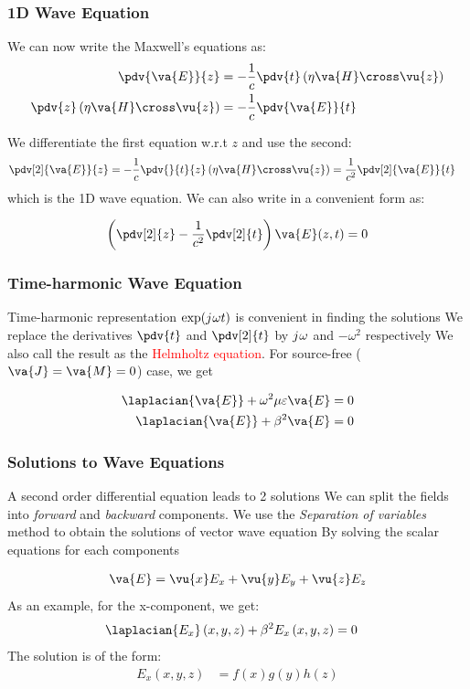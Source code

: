 \documentclass[10pt, compress]{beamer}
\renewcommand{\O}{\omega}  %
\newcommand{\E}{\varepsilon}  %
\renewcommand{\u}{\mu}  %
\renewcommand{\j}{{j}\mkern1mu} %
\begin{document}
\begin{frame}
  \frametitle{1D Wave Equation}
  We can now write the Maxwell's equations as:
  \begin{align*}
     \pdv{\va{E}}{z} &= - \frac{1}{c} \pdv{t} \left( \eta \va{H} \cross \vu{z} \right) \\
     \pdv{z} \left( \eta \va{H} \cross \vu{z} \right) &= -\frac{1}{c} \pdv{\va{E}}{t}
      \end{align*}

    We differentiate the first equation w.r.t $z$ and use the second:
    \begin{align*}
      \pdv[2]{\va{E}}{z} &= - \frac{1}{c} \pdv{}{t}{z} \left( \eta \va{H} \cross \vu{z} \right) = \frac{1}{c^2} \pdv[2]{\va{E}}{t}
    \end{align*}
    which is the 1D wave equation. We can also write in a convenient form as:
    \begin{tcolorbox}
      \begin{align*}
      \left( \pdv[2]{z} - \frac{1}{c^2} \pdv[2]{t}\right) \va{E} (z,t) = 0
    \end{align*}
    \end{tcolorbox}
\end{frame}

\begin{frame}
  \frametitle{Time-harmonic Wave Equation}
  \begin{outline}
    \1 Time-harmonic representation $\exp (\j \O t)$ is convenient in finding the solutions
    \1 We replace the derivatives $\pdv{t}$ and $\pdv[2]{t}$ by $\j \O$ and $-\O^2$ respectively
    \1 We also call the result as the \textcolor{red}{Helmholtz equation}.
    \1 For source-free ($\va{J} = \va{M} = 0$) case, we get
  \end{outline}
  \begin{align*}
    \laplacian{\va{E}} + \O^2 \u \E \va{E} &= 0 \\
    \laplacian{\va{E}} + \beta^2 \va{E} &= 0
  \end{align*}
  \end{frame}

  \begin{frame}
  \frametitle{Solutions to Wave Equations}
  \begin{outline}
    \1 A second order differential equation leads to 2 solutions
    \2 We can split the fields into \textit{forward} and \textit{backward} components.
    \1 We use the \textit{Separation of variables} method to obtain the solutions of vector wave equation
    \2 By solving the scalar equations for each components
  \end{outline}
  \begin{align*}
    \va{E} = \vu{x} E_x + \vu{y} E_y + \vu{z} E_z
  \end{align*}
  As an example, for the x-component, we get:
  \begin{align*}
    \laplacian{E_x}\left(x,y,z \right) + \beta^2 {E_x}\left(x,y,z \right) &= 0
  \end{align*}
  The solution is of the form:
  \begin{align*}
    E_x \left(x,y,z \right) &= f(x)g(y)h(z)
  \end{align*}
  \end{frame}
\end{document}
